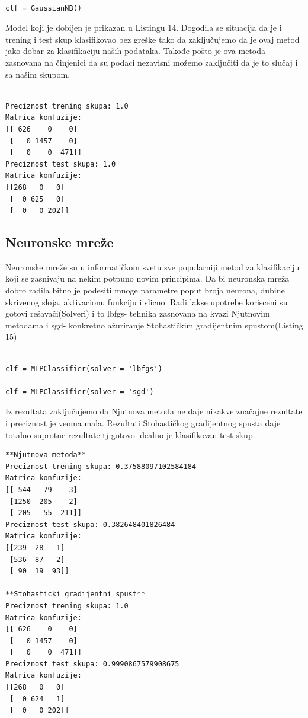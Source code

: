 \documentclass[14pt]{extarticle}
\begin{document}
\begin{lstlisting}[caption={Funkicje Bajesov algoritam},frame=single, label=simple]

clf = GaussianNB()

\end{lstlisting}
Model koji je dobijen je prikazan u Listingu 14. Dogodila se situacija da je i trening i test skup klasifikovao bez greške tako da zaključujemo da je ovaj metod jako dobar za klasifikaciju naših podataka. Takođe pošto je ova metoda zasnovana na činjenici da su podaci nezavisni možemo zaključiti da je to slučaj i sa našim skupom.

\begin{lstlisting}[caption={Rezultati Bajesov algoritam},frame=single, label=simple]

Preciznost trening skupa: 1.0
Matrica konfuzije:
[[ 626    0    0]
 [   0 1457    0]
 [   0    0  471]]
Preciznost test skupa: 1.0
Matrica konfuzije:
[[268   0   0]
 [  0 625   0]
 [  0   0 202]]

\end{lstlisting}
\subsection{Neuronske mreže}
\label{subsec:podnaslovM}
Neuronske mreže su u informatičkom svetu sve popularniji metod za klasifikaciju koji se zasnivaju na nekim potpuno novim principima. Da bi neuronska mreža dobro radila bitno je podesiti mnoge parametre poput broja neurona, dubine skrivenog sloja, aktivacionu funkciju i slicno. Radi lakse upotrebe korisceni su gotovi rešavači(Solveri) i to lbfgs- tehnika zasnovana na kvazi Njutnovim metodama i sgd- konkretno ažuriranje Stohastičkim gradijentnim spustom(Listing 15)

\begin{lstlisting}[caption={Funkcije neuronske mreže},frame=single, label=simple]

clf = MLPClassifier(solver = 'lbfgs')

clf = MLPClassifier(solver = 'sgd')

\end{lstlisting}
Iz rezultata zaključujemo da Njutnova metoda ne daje nikakve značajne rezultate i preciznost je veoma mala. Rezultati Stohastičkog gradijentnog spusta daje totalno suprotne rezultate tj gotovo idealno je klasifikovan test skup.
\begin{lstlisting}[caption={Rezultati neuronske mreže},frame=single, label=simple]
**Njutnova metoda**
Preciznost trening skupa: 0.37588097102584184
Matrica konfuzije:
[[ 544   79    3]
 [1250  205    2]
 [ 205   55  211]]
Preciznost test skupa: 0.382648401826484
Matrica konfuzije:
[[239  28   1]
 [536  87   2]
 [ 90  19  93]]
 
**Stohasticki gradijentni spust**
Preciznost trening skupa: 1.0
Matrica konfuzije:
[[ 626    0    0]
 [   0 1457    0]
 [   0    0  471]]
Preciznost test skupa: 0.9990867579908675
Matrica konfuzije:
[[268   0   0]
 [  0 624   1]
 [  0   0 202]]

\end{lstlisting}
\end{document}
